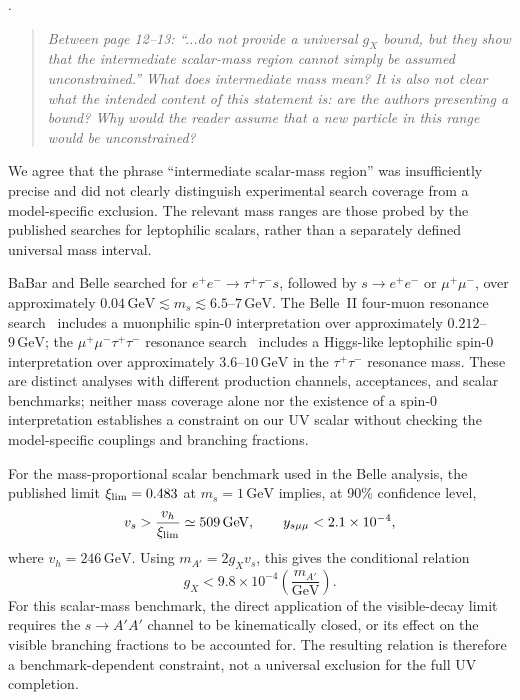 \documentclass[12pt,a4paper]{article}
\begin{document}
\medskip
{}. \begin{quote}\itshape
Between page 12--13: ``...do not provide a universal \(g_X\) bound, but they show that the intermediate scalar-mass region cannot simply be assumed unconstrained.'' What does intermediate mass mean? It is also not clear what the intended content of this statement is: are the authors presenting a bound? Why would the reader assume that a new particle in this range would be unconstrained?
\end{quote}

We agree that the phrase ``intermediate scalar-mass region'' was insufficiently precise and did not clearly distinguish experimental search coverage from a model-specific exclusion. The relevant mass ranges are those probed by the published searches for leptophilic scalars, rather than a separately defined universal mass interval.

BaBar and Belle searched for
\(e^+e^-\to\tau^+\tau^-s\), followed by
\(s\to e^+e^-\) or \(\mu^+\mu^-\), over approximately
\(0.04\,\mathrm{GeV}\lesssim m_s\lesssim6.5\)--\(7\,\mathrm{GeV}\).
The Belle~II four-muon resonance search~\cite{Belle-II:2024wtd} includes a muonphilic spin-0 interpretation over approximately \(0.212\)--\(9\,\mathrm{GeV}\); the \(\mu^+\mu^-\tau^+\tau^-\) resonance search~\cite{Belle-II:2023ydz} includes a Higgs-like leptophilic spin-0 interpretation over approximately \(3.6\)--\(10\,\mathrm{GeV}\) in the \(\tau^+\tau^-\) resonance mass. These are distinct analyses with different production channels, acceptances, and scalar benchmarks; neither mass coverage alone nor the existence of a spin-0 interpretation establishes a constraint on our UV scalar without checking the model-specific couplings and branching fractions.

For the mass-proportional scalar benchmark used in the Belle analysis, the published limit \(\xi_{\rm lim}=0.483\) at \(m_s=1\,\mathrm{GeV}\) implies, at 90\% confidence level,
\[
v_s>\frac{v_h}{\xi_{\rm lim}}
\simeq509\,\mathrm{GeV},
\qquad
y_{s\mu\mu}<2.1\times10^{-4},
\]
where \(v_h=246\,\mathrm{GeV}\). Using \(m_{A'}=2g_Xv_s\), this gives the conditional relation
\[
g_X<9.8\times10^{-4}
\left(\frac{m_{A'}}{\mathrm{GeV}}\right).
\]
For this scalar-mass benchmark, the direct application of the visible-decay limit requires the \(s\to A'A'\) channel to be kinematically closed, or its effect on the visible branching fractions to be accounted for. The resulting relation is therefore a benchmark-dependent constraint, not a universal exclusion for the full UV completion.
\end{document}
